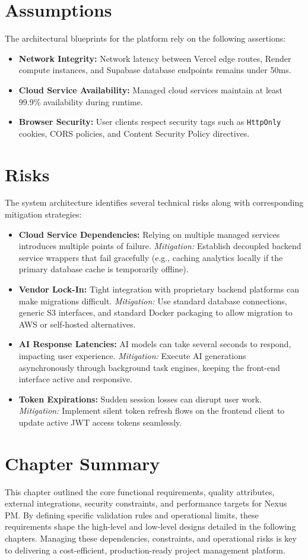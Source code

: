 \section{Assumptions}
The architectural blueprints for the platform rely on the following assertions:
\begin{itemize}
    \item \textbf{Network Integrity:} Network latency between Vercel edge routes, Render compute instances, and Supabase database endpoints remains under 50ms.
    \item \textbf{Cloud Service Availability:} Managed cloud services maintain at least 99.9\% availability during runtime.
    \item \textbf{Browser Security:} User clients respect security tags such as \texttt{HttpOnly} cookies, CORS policies, and Content Security Policy directives.
\end{itemize}

\section{Risks}
The system architecture identifies several technical risks along with corresponding mitigation strategies:
\begin{itemize}
    \item \textbf{Cloud Service Dependencies:} Relying on multiple managed services introduces multiple points of failure. \textit{Mitigation:} Establish decoupled backend service wrappers that fail gracefully (e.g., caching analytics locally if the primary database cache is temporarily offline).
    \item \textbf{Vendor Lock-In:} Tight integration with proprietary backend platforms can make migrations difficult. \textit{Mitigation:} Use standard database connections, generic S3 interfaces, and standard Docker packaging to allow migration to AWS or self-hosted alternatives.
    \item \textbf{AI Response Latencies:} AI models can take several seconds to respond, impacting user experience. \textit{Mitigation:} Execute AI generations asynchronously through background task engines, keeping the front-end interface active and responsive.
    \item \textbf{Token Expirations:} Sudden session losses can disrupt user work. \textit{Mitigation:} Implement silent token refresh flows on the frontend client to update active JWT access tokens seamlessly.
\end{itemize}

\section{Chapter Summary}
This chapter outlined the core functional requirements, quality attributes, external integrations, security constraints, and performance targets for Nexus PM. By defining specific validation rules and operational limits, these requirements shape the high-level and low-level designs detailed in the following chapters. Managing these dependencies, constraints, and operational risks is key to delivering a cost-efficient, production-ready project management platform.
